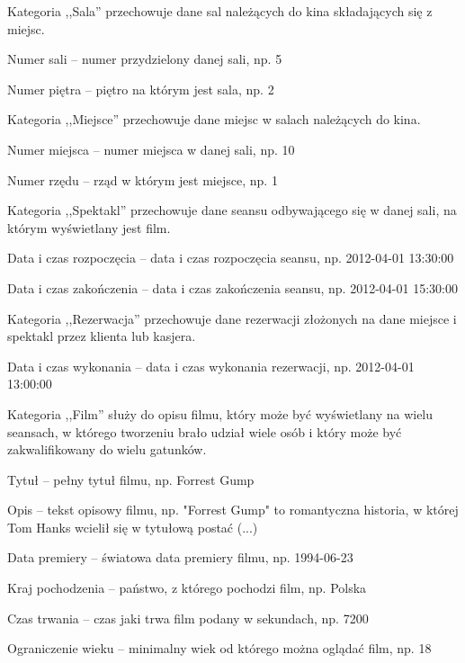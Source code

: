 \opis Kategoria ,,Sala'' przechowuje dane sal należących do kina składających się z miejsc.
\begin{atrybuty}
    \item Numer sali -- numer przydzielony danej sali, np. 5
    \item Numer piętra -- piętro na którym jest sala, np. 2
\end{atrybuty}

\opis Kategoria ,,Miejsce'' przechowuje dane miejsc w salach należących do kina.
\begin{atrybuty}
    \item Numer miejsca -- numer miejsca w danej sali, np. 10
    \item Numer rzędu -- rząd w którym jest miejsce, np. 1
\end{atrybuty}

\opis Kategoria ,,Spektakl'' przechowuje dane seansu odbywającego się w danej sali, na którym wyświetlany jest film.
\begin{atrybuty}
    \item Data i czas rozpoczęcia -- data i czas rozpoczęcia seansu, np. 2012-04-01 13:30:00
    \item Data i czas zakończenia -- data i czas zakończenia seansu, np. 2012-04-01 15:30:00
\end{atrybuty}

\opis Kategoria ,,Rezerwacja'' przechowuje dane rezerwacji złożonych na dane miejsce i spektakl przez klienta lub kasjera.
\begin{atrybuty}
    \item Data i czas wykonania -- data i czas wykonania rezerwacji, np. 2012-04-01 13:00:00
\end{atrybuty}

\opis Kategoria ,,Film'' służy do opisu filmu, który może być wyświetlany na wielu seansach, w którego tworzeniu brało udział wiele osób i który może być zakwalifikowany do wielu gatunków.
\begin{atrybuty}
    \item Tytuł -- pełny tytuł filmu, np. Forrest Gump
    \item Opis -- tekst opisowy filmu, np. "Forrest Gump" to romantyczna historia, w której Tom Hanks wcielił się w tytułową postać (...)
    \item Data premiery -- światowa data premiery filmu, np. 1994-06-23
	\item Kraj pochodzenia -- państwo, z którego pochodzi film, np. Polska
    \item Czas trwania -- czas jaki trwa film podany w sekundach, np. 7200
    \item Ograniczenie wieku -- minimalny wiek od którego można oglądać film, np. 18
\end{atrybuty}

